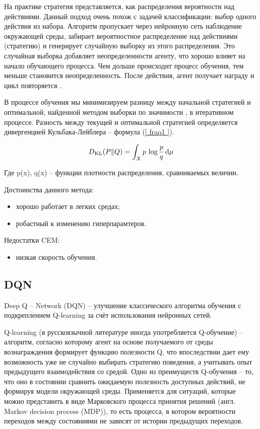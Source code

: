 На практике стратегия представляется, как распределения вероятности над действиями. 
Данный подход очень похож с задачей классификации: выбор одного действия из набора. 
Алгоритм пропускает через нейронную сеть наблюдение окружающей среды, забирает вероятностное распределение над действиями (стратегию) и генерирует случайную выборку из этого распределения. 
Это случайная выборка добавляет неопределенности агенту, что хорошо влияет на начало обучающего процесса. Чем дольше происходит процесс обучения, тем меньше становится неопределенность. 
После действия, агент получает награду и цикл повторяется \cite{CEM}.

В процессе обучения мы минимизируем разницу между начальной стратегией и оптимальной, найденной методом выборки по значимости \cite{CEM1}, в итеративном процессе. 
Разность между текущей и оптимальной стратегией определяется дивергенцией Кульбака-Лейблера -- формула (\ref{ fraq1 }).

\begin{equation}\label{ fraq1 }
\displaystyle D_{\mathrm {KL} }(P\|Q)=\int _{X}p\,\log {\frac {p}{q}}\,{\rm {d}}\mu 
\end{equation}

Где p(x), q(x) -- функции плотности распределения, сравниваемых величин.

Достоинства данного метода:
\begin{itemize}
	\item хорошо работает в легких средах;
	\item робастный к изменению гиперпарамтеров.
\end{itemize}

Недостатки CEM:
\begin{itemize}
	\item низкая скорость обучения.
\end{itemize}

\subsection{DQN}

Deep Q – Network (DQN) – улучшение классического алгоритма обучения с подкреплением Q-learning за счёт использования нейронных сетей.

Q-learning (в русскоязычной литературе иногда употребляется Q-обучение) – алгоритм, согласно которому агент на основе получаемого от среды вознаграждения формирует функцию полезности Q, что впоследствии дает ему возможность уже не случайно выбирать стратегию поведения, а учитывать опыт предыдущего взаимодействия со средой. 
Одно из преимуществ Q-обучения -- то, что оно в состоянии сравнить ожидаемую полезность доступных действий, не формируя модели окружающей среды. 
Применяется для ситуаций, которые можно представить в виде Марковского процесса принятия решений (англ. Markov decision process (MDP)), то есть процесса, в котором вероятности переходов между состояниями не зависят от истории предыдущих переходов. 

